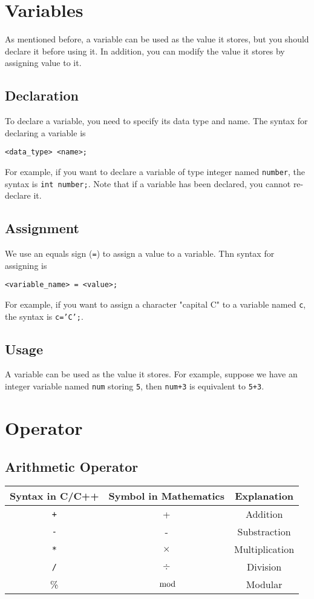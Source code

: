 \documentclass{report}
\begin{document}
\section{Variables}
    As mentioned before, a variable can be used as the value it stores, but you should declare it before using it. In addition, you can modify the value it stores by assigning value to it.

    \subsection{Declaration}
    To declare a variable, you need to specify its data type and name. The syntax for declaring a variable is
    \begin{center}\texttt{<data\_type> <name>;}\end{center}
    For example, if you want to declare a variable of type integer named \texttt{number}, the syntax is \texttt{int number;}. Note that if a variable has been declared, you cannot re-declare it.

    \subsection{Assignment}
    We use an equals sign (\texttt{=}) to assign a value to a variable. Thn syntax for assigning is
    \begin{center}\texttt{<variable\_name> = <value>;}\end{center}
    For example, if you want to assign a character "capital C" to a variable named \texttt{c}, the syntax is \texttt{c='C';}.

    \subsection{Usage}
    A variable can be used as the value it stores. For example, suppose we have an integer variable named \texttt{num} storing \texttt{5}, then \texttt{num+3} is equivalent to \texttt{5+3}.

\section{Operator}
    \subsection{Arithmetic Operator}
    \begin{tabular}{|c|c|c|}
    Syntax in C/C++ &   Symbol in Mathematics  &    Explanation\\
    \hline
    \texttt{+}               &   +                      &    Addition\\
    \texttt{-}               &   -                      &    Substraction\\
    \texttt{*}               &   $\times$               &    Multiplication\\
    \texttt{/}               &   $\div$                 &    Division\\
    \%              &   $\mod$                 &    Modular\\
    \end{tabular}
    
\end{document}
